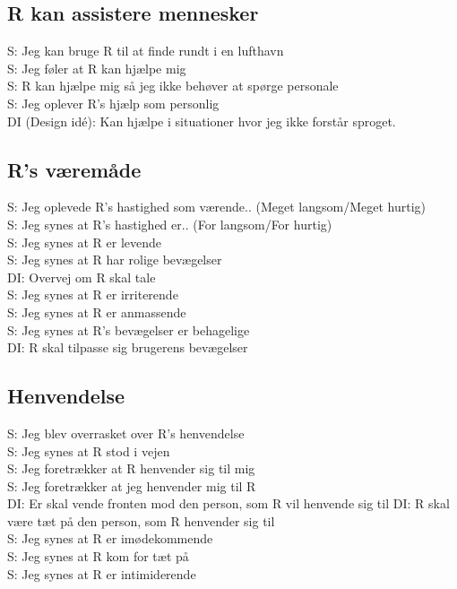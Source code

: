 \subsection{R kan assistere mennesker}
%
S: Jeg kan bruge R til at finde rundt i en lufthavn\\
S: Jeg føler at R kan hjælpe mig\\
S: R kan hjælpe mig så jeg ikke behøver at spørge personale\\
S: Jeg oplever R's hjælp som personlig\\
DI (Design idé): Kan hjælpe i situationer hvor jeg ikke forstår sproget. 

\subsection{R's væremåde}
%
S: Jeg oplevede R's hastighed som værende.. (Meget langsom/Meget hurtig)\\
S: Jeg synes at R's hastighed er.. (For langsom/For hurtig)\\
S: Jeg synes at R er levende\\
S: Jeg synes at R har rolige bevægelser\\
DI: Overvej om R skal tale\\
S: Jeg synes at R er irriterende\\
S: Jeg synes at R er anmassende\\
S: Jeg synes at R's bevægelser er behagelige\\
DI: R skal tilpasse sig brugerens bevægelser

\subsection{Henvendelse}
%
S: Jeg blev overrasket over R's henvendelse\\
S: Jeg synes at R stod i vejen\\
S: Jeg foretrækker at R henvender sig til mig\\
S: Jeg foretrækker at jeg henvender mig til R\\
DI: Er skal vende fronten mod den person, som R vil henvende sig til
DI: R skal være tæt på den person, som R henvender sig til\\
S: Jeg synes at R er imødekommende\\
S: Jeg synes at R kom for tæt på\\
S: Jeg synes at R er intimiderende\\


